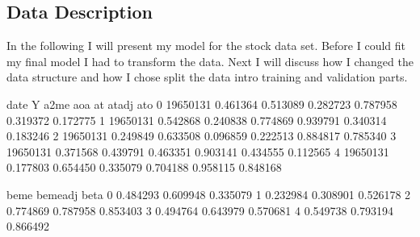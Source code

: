 \documentclass[letterpaper,10pt,english]{sphinxmanual}
\begin{document}
\subsection{Data Description}
\label{\detokenize{stock_intro:data-description}}\label{\detokenize{stock_intro::doc}}
In the following I will present my model for the stock data set. Before I could fit my final model I had to transform the data. Next I will discuss how I changed the data structure and how I chose split the data intro training and validation parts.

\begin{sphinxVerbatim}[commandchars=\\\{\}]
 
   
   

  
\end{sphinxVerbatim}

\begin{sphinxVerbatim}[commandchars=\\\{\}]
      
\PYG{p}{[} \PYG{p}{]}
\end{sphinxVerbatim}

\begin{sphinxVerbatim}[commandchars=\\\{\}]
         date         Y      a2me       aoa        at    at\PYGZus{}adj       ato  \PYGZbs{}
0  1965\PYGZhy{}01\PYGZhy{}31  0.461364  0.513089  0.282723  0.787958  0.319372  0.172775   
1  1965\PYGZhy{}01\PYGZhy{}31  0.542868  0.240838  0.774869  0.939791  0.340314  0.183246   
2  1965\PYGZhy{}01\PYGZhy{}31  0.249849  0.633508  0.096859  0.222513  0.884817  0.785340   
3  1965\PYGZhy{}01\PYGZhy{}31  0.371568  0.439791  0.463351  0.903141  0.434555  0.112565   
4  1965\PYGZhy{}01\PYGZhy{}31 \PYGZhy{}0.177803  0.654450  0.335079  0.704188  0.958115  0.848168   

       beme  beme\PYGZus{}adj      beta  
0  0.484293  0.609948  0.335079  
1  0.232984  0.308901  0.526178  
2  0.774869  0.787958  0.853403  
3  0.494764  0.643979  0.570681  
4  0.549738  0.793194  0.866492  
\end{sphinxVerbatim}
\end{document}
